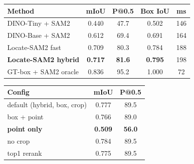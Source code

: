 \begin{table}[t]
  \begin{minipage}[t]{0.47\textwidth}
    \centering
    \label{tab:refcoco-plus}
    \scriptsize
    \renewcommand{\arraystretch}{1.08}
    \setlength{\tabcolsep}{3pt}
    \begin{tabular*}{\linewidth}{@{\extracolsep{\fill}}lcccc@{}}
      \toprule
      Method & mIoU & P@0.5 & Box IoU & ms \\
      \midrule
      DINO-Tiny + SAM2  & 0.440 & 47.7 & 0.502 & 146 \\
      DINO-Base + SAM2  & 0.612 & 69.4 & 0.691 & 164 \\
      Locate-SAM2 fast  & 0.709 & 80.3 & 0.784 & 188 \\
      \textbf{Locate-SAM2 hybrid} & \textbf{0.717} & \textbf{81.6} & \textbf{0.795} & 198 \\
      GT-box + SAM2 oracle & 0.836 & 95.2 & 1.000 & 72 \\
      \bottomrule
    \end{tabular*}
  \end{minipage}\hfill
  \begin{minipage}[t]{0.47\textwidth}
    \centering
    \label{tab:ablation}
    \scriptsize
    \setlength{\tabcolsep}{3pt}
    \begin{tabular*}{\linewidth}{@{\extracolsep{\fill}}lcc@{}}
      \toprule
      Config & mIoU & P@0.5 \\
      \midrule
      default (hybrid, box, crop) & 0.777 & 89.5 \\
      box + point & 0.766 & 89.0 \\
      \textbf{point only} & \textbf{0.509} & \textbf{56.0} \\
      no crop & 0.784 & 89.5 \\
      top1 rerank & 0.775 & 89.5 \\
      \bottomrule
    \end{tabular*}
  \end{minipage}
\end{table}

